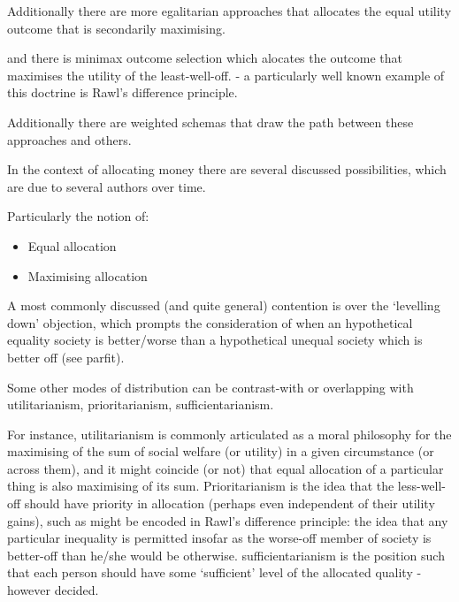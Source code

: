 Additionally there are more egalitarian approaches that allocates the equal utility outcome that is secondarily maximising.

and there is minimax outcome selection which alocates the outcome that maximises the utility of the least-well-off.
- a particularly well known example of this doctrine is Rawl's difference principle.

Additionally there are weighted schemas that draw the path between these approaches and others.

 





In the context of allocating money there are several discussed possibilities, which are due to several authors over time.

Particularly the notion of:
\begin{itemize}
\item Equal allocation
\item Maximising allocation
\end{itemize}





A most commonly discussed (and quite general) contention is over the `levelling down' objection, which prompts the consideration of when an hypothetical equality society is better/worse than a hypothetical unequal society which is better off (see parfit).

Some other modes of distribution can be contrast-with or overlapping with utilitarianism, prioritarianism, sufficientarianism.

For instance, utilitarianism is commonly articulated as a moral philosophy for the maximising of the sum of social welfare (or utility) in a given circumstance (or across them), and it might coincide (or not) that equal allocation of a particular thing is also maximising of its sum.
Prioritarianism is the idea that the less-well-off should have priority in allocation (perhaps even independent of their utility gains), such as might be encoded in Rawl's difference principle: the idea that any particular inequality is permitted insofar as the worse-off member of society is better-off than he/she would be otherwise.
sufficientarianism is the position such that each person should have some `sufficient' level of the allocated quality - however decided.

